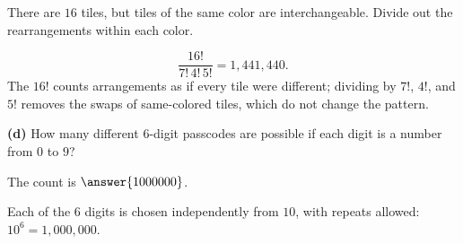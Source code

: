 \documentclass[12pt]{ximera}
\begin{document}
\begin{problem}
\begin{prompt}
\begin{hint}
There are $16$ tiles, but tiles of the same color are interchangeable. Divide out the
rearrangements within each color.
\end{hint}

\begin{feedback}
\[
\frac{16!}{7!\,4!\,5!}=1{,}441{,}440.
\]
The $16!$ counts arrangements as if every tile were different; dividing by $7!$, $4!$,
and $5!$ removes the swaps of same-colored tiles, which do not change the pattern.
\end{feedback}
\end{prompt}

\begin{prompt}
\textbf{(d)} How many different $6$-digit passcodes are possible if each digit is a
number from $0$ to $9$?

\begin{multipleChoice}
\end{multipleChoice}

The count is $\answer{1000000}$.

\begin{feedback}
Each of the $6$ digits is chosen independently from $10$, with repeats allowed:
$10^6=1{,}000{,}000$.
\end{feedback}
\end{prompt}
\end{problem}
\end{document}
